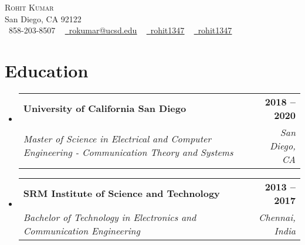 \documentclass[letterpaper,11pt]{article}
\makeatletter
\newcommand{\resumeSubheading}[4]{
  \vspace{-2pt}\item
    \begin{tabular*}{1.0\textwidth}[t]{l@{\extracolsep{\fill}}r}
      \textbf{#1} & \textbf{\small #2} \\
      \textit{\small#3} & \textit{\small #4} \\
    \end{tabular*}\vspace{-7pt}
}
\newcommand{\resumeSubHeadingListStart}{\begin{itemize}[leftmargin=0.0in, label={}]}
\newcommand{\resumeSubHeadingListEnd}{\end{itemize}}
\makeatother
\begin{document}

\begin{center}
    {\Huge \scshape Rohit Kumar} \\ \vspace{1pt}
    San Diego, CA 92122 \\ \vspace{1pt}
    \small \raisebox{-0.1\height}\faPhone\ 858-203-8507 ~ \href{mailto:rokumar@ucsd.edu}{\raisebox{-0.2\height}\faEnvelope\  \underline{rokumar@ucsd.edu}} ~ 
    \href{https://www.linkedin.com/in/rohit1347/}{\raisebox{-0.2\height}\faLinkedin\ \underline{rohit1347}}  ~
    \href{https://github.com/rohit1347}{\raisebox{-0.2\height}\faGithub\ \underline{rohit1347}}
    \vspace{-8pt}
\end{center}


\section{Education}
  \resumeSubHeadingListStart
    \resumeSubheading
      {University of California San Diego}{2018 -- 2020}
      {Master of Science in Electrical and Computer Engineering - Communication Theory and Systems}{San Diego, CA}
       \resumeSubheading
      {SRM Institute of Science and Technology}{2013 -- 2017}
      {Bachelor of Technology in Electronics and Communication Engineering}{Chennai, India}
  \resumeSubHeadingListEnd

\end{document}

